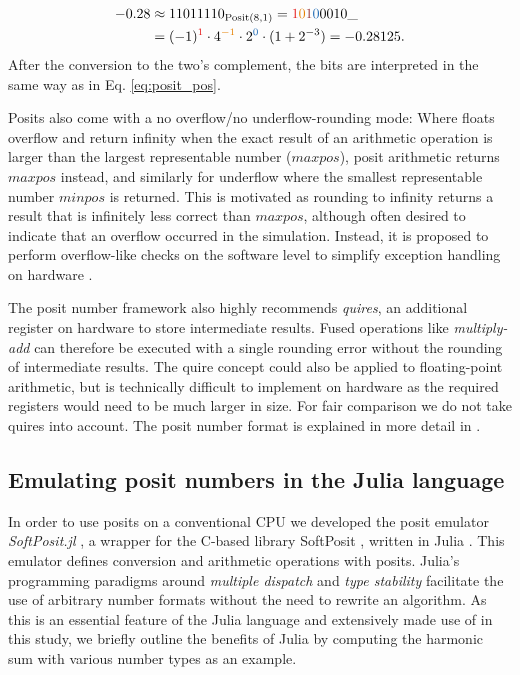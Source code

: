 \documentclass[draft]{agujournal2019}
\newcommand{\op}{\operatorname}
\begin{document}
\begin{equation}
\begin{split}
-0.28 &  \approx 11011110_{\op{Posit}(8,1)} = {\color{psign}1}{\color{pregime}0}{\color{pregimet}1}{\color{pexpo}0}0010\_ \\
& = (-1)^{\color{psign}1} \cdot 4^{\color{pregime}-1} \cdot 2^{\color{pexpo}0} \cdot (1+2^{-3}) = -0.28125.
\end{split}
\label{eq:2comp}
\end{equation}
After the conversion to the two's complement, the bits are interpreted in the same way as in Eq. \ref{eq:posit_pos}.

Posits also come with a no overflow/no underflow-rounding mode: Where floats overflow and return infinity when the exact result of an arithmetic operation is larger than the largest representable number ($maxpos$), posit arithmetic returns $maxpos$ instead, and similarly for underflow where the smallest representable number $minpos$ is returned. This is motivated as rounding to infinity returns a result that is infinitely less correct than $maxpos$, although often desired to indicate that an overflow occurred in the simulation. Instead, it is proposed to perform overflow-like checks on the software level to simplify exception handling on hardware \cite{Gustafson2017b}.

The posit number framework also highly recommends \emph{quires}, an additional register on hardware to store intermediate results. Fused operations like \emph{multiply-add} can therefore be executed with a single rounding error without the rounding of intermediate results. The quire concept could also be applied to floating-point arithmetic, but is technically difficult to implement on hardware as the required registers would need to be much larger in size. For fair comparison we do not take quires into account. The posit number format is explained in more detail in .

\subsection{Emulating posit numbers in the Julia language}
\label{sec:Julia}

In order to use posits on a conventional CPU we developed the posit emulator \emph{SoftPosit.jl} \cite{Kloewer2019}, a wrapper for the C-based library SoftPosit \cite{Heung2019}, written in Julia \cite{Bezanson2014}. This emulator defines conversion and arithmetic operations with posits. Julia's programming paradigms around \emph{multiple dispatch} and \emph{type stability} facilitate the use of arbitrary number formats without the need to rewrite an algorithm. As this is an essential feature of the Julia language and extensively made use of in this study, we briefly outline the benefits of Julia by computing the harmonic sum with various number types as an example.
\end{document}
